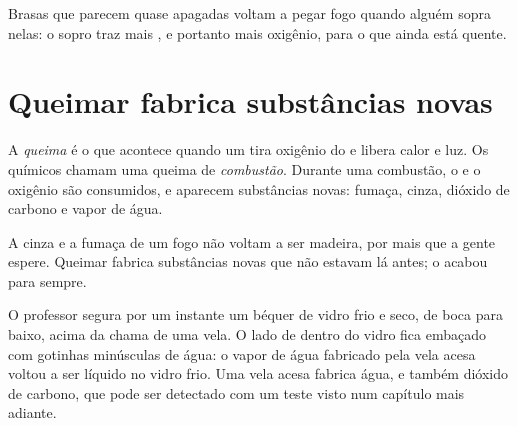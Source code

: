 \begin{example}\label{ex:g4:what-a-fire-needs:embers}
Brasas que parecem quase apagadas voltam a pegar fogo quando alguém
sopra nelas: o sopro traz mais , e portanto mais oxigênio, para o
 que ainda está quente.
\end{example}

\section{Queimar fabrica substâncias novas}

\begin{definition}\label{def:g4:what-a-fire-needs:burning}
A \emph{queima} é o que acontece quando um  tira
oxigênio do  e libera calor e luz. Os químicos chamam uma queima de
\emph{combustão}. Durante uma combustão, o 
e o oxigênio são consumidos, e aparecem substâncias novas: fumaça,
cinza, dióxido de carbono e vapor de água.
\end{definition}

\begin{proposition}\label{prop:g4:what-a-fire-needs:new}
A cinza e a fumaça de um fogo não voltam a ser madeira, por mais que a
gente espere. Queimar fabrica substâncias novas que não estavam lá
antes; o  acabou para sempre.
\end{proposition}

\begin{inthelab}
O professor segura por um instante um béquer de vidro frio e seco, de
boca para baixo, acima da chama de uma vela. O lado de dentro do vidro
fica embaçado com gotinhas minúsculas de água: o vapor de água fabricado
pela vela acesa voltou a ser líquido no vidro frio. Uma vela acesa
fabrica água, e também dióxido de carbono, que pode ser detectado com um
teste visto num capítulo mais adiante.
\end{inthelab}

